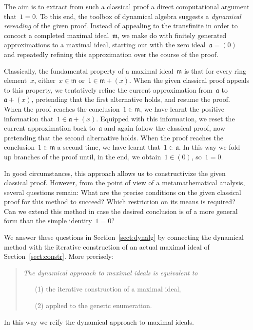 \documentclass[com,11pt,crcready]{iosart2x}
\theoremstyle{definition}
\theoremstyle{plain}
\theoremstyle{remark}
\newcommand{\?}{\,{:}\,}
\newcommand{\aaa}{\mathfrak{a}}
\newcommand{\mmm}{\mathfrak{m}}
\renewcommand{\_}{\mathpunct{.}\,}
\begin{document}
The aim is to extract from such a classical proof a direct computational argument that~$1 = 0$.
To this end, the toolbox of dynamical algebra suggests a
\emph{dynamical rereading} of the given proof. Instead of appealing to the
transfinite in order to concoct a completed maximal ideal~$\mmm$, we make do
with finitely generated approximations to a maximal ideal, starting out with
the zero ideal~$\aaa = (0)$ and repeatedly refining this approximation over the
course of the proof.

\label{page:dynalg-folding}
Classically, the fundamental property of a maximal ideal~$\mmm$ is that for every ring
element~$x$, either~$x \in \mmm$ or~$1 \in \mmm + (x)$. When the given classical
proof appeals to this property, we tentatively refine the current
approximation from~$\aaa$ to~$\aaa + (x)$, pretending that the first alternative
holds, and resume the proof. When the proof reaches the conclusion~$1 \in
\mmm$, we have learnt the positive information that~$1 \in \aaa + (x)$.
Equipped with this information, we reset the current approximation back to~$\aaa$
and again follow the classical proof, now pretending that the second
alternative holds. When the proof reaches the conclusion~$1 \in \mmm$ a second
time, we have learnt that~$1 \in \aaa$. In this way we fold up branches of the
proof until, in the end, we obtain~$1 \in (0)$, so~$1 = 0$.

In good circumstances, this approach allows us to constructivize the given
classical proof. However, from the point of view of a metamathematical
analysis, several questions remain: What are the precise conditions on the
given classical proof for this method to succeed? Which restriction on its
means is required?
Can we extend this method in
case the desired conclusion is of a more general form than the simple
identity~$1 = 0$?

We answer these questions in Section~\ref{sect:dynalg} by connecting the
dynamical method with the iterative construction of an actual maximal ideal of
Section~\ref{sect:constr}. More precisely:
\begin{quote}\it The dynamical approach to maximal ideals is equivalent to
\begin{enumerate}
\item[(1)] the iterative construction of a maximal ideal,
\item[(2)] applied to the generic enumeration.
\end{enumerate}
\end{quote}
In this way we reify the dynamical approach to maximal ideals.
\end{document}
